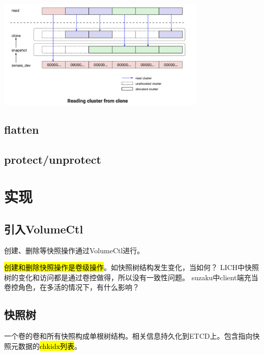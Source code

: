 \begin{center}
\includegraphics[width=10cm]{../imgs/snapshot/clone-read.png}
\end{center}

\subsection{flatten}

\subsection{protect/unprotect}

\section{实现}

\subsection{引入VolumeCtl}

创建、删除等快照操作通过VolumeCtl进行。

\hl{创建和删除快照操作是卷级操作}。如快照树结构发生变化，当如何？
LICH中快照树的变化和访问都是通过卷控做得，所以没有一致性问题。
suzaku中client端充当卷控角色，在多活的情况下，有什么影响？


\subsection{快照树}

一个卷的卷和所有快照构成单根树结构。相关信息持久化到ETCD上。包含指向快照元数据的\hl{chkidx列表}。



